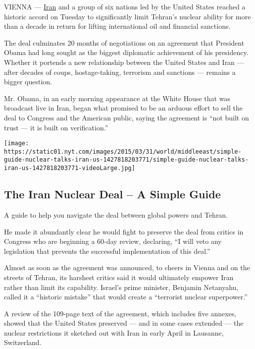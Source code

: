 VIENNA ---
\href{http://topics.nytimes.com/top/news/international/countriesandterritories/iran/index.html?inline=nyt-geo}{Iran}
and a group of six nations led by the United States reached a historic
accord on Tuesday to significantly limit Tehran's nuclear ability for
more than a decade in return for lifting international oil and financial
sanctions.

The deal culminates 20 months of negotiations on an agreement that
President Obama had long sought as the biggest diplomatic achievement of
his presidency. Whether it portends a new relationship between the
United States and Iran --- after decades of coups, hostage-taking,
terrorism and sanctions --- remains a bigger question.

Mr. Obama, in an early morning appearance at the White House that was
broadcast live in Iran, began what promised to be an arduous effort to
sell the deal to Congress and the American public, saying the agreement
is ``not built on trust --- it is built on verification.''

\href{https://www.nytimes.com/interactive/2015/03/31/world/middleeast/simple-guide-nuclear-talks-iran-us.html}{}

\texttt{[image: https://static01.nyt.com/images/2015/03/31/world/middleeast/simple-guide-nuclear-talks-iran-us-1427818203771/simple-guide-nuclear-talks-iran-us-1427818203771-videoLarge.jpg]}

\hypertarget{the-iran-nuclear-deal--a-simple-guide}{%
\subsection{The Iran Nuclear Deal -- A Simple
Guide}\label{the-iran-nuclear-deal--a-simple-guide}}

A guide to help you navigate the deal between global powers and Tehran.

He made it abundantly clear he would fight to preserve the deal from
critics in Congress who are beginning a 60-day review, declaring, ``I
will veto any legislation that prevents the successful implementation of
this deal.''

Almost as soon as the agreement was announced, to cheers in Vienna and
on the streets of Tehran, its harshest critics said it would ultimately
empower Iran rather than limit its capability. Israel's prime minister,
Benjamin Netanyahu, called it a ``historic mistake'' that would create a
``terrorist nuclear superpower.''

A review of the 109-page text of the agreement, which includes five
annexes, showed that the United States preserved --- and in some cases
extended --- the nuclear restrictions it sketched out with Iran in early
April in Lausanne, Switzerland.

